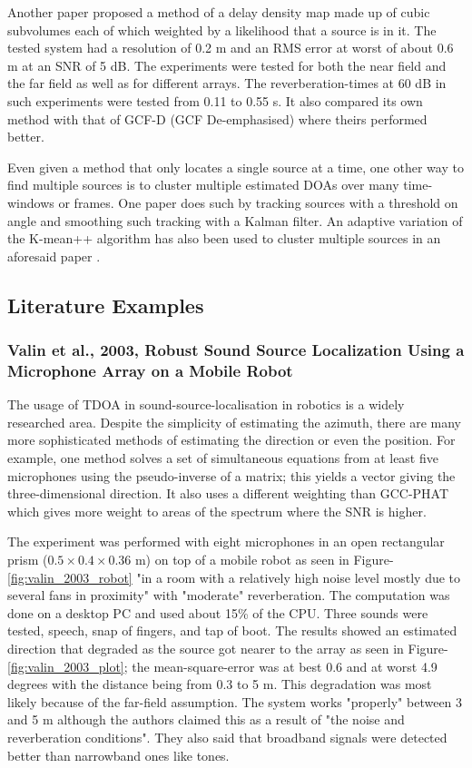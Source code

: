 \documentclass[notitlepage]{report}
\begin{document}
Another paper \cite{boora_tdoa-based_2020} proposed a method of a delay density map made up of cubic subvolumes each of which weighted by a likelihood that a source is in it. The tested system had a resolution of 0.2 \si{m} and an RMS error at worst of about 0.6 \si{m} at an SNR of 5 \si{dB}. The experiments were tested for both the near field and the far field as well as for different arrays. The reverberation-times at 60 \si{dB} in such experiments were tested from 0.11 to 0.55 \si{s}. It also compared its own method with that of GCF-D (GCF De-emphasised) where theirs performed better.

Even given a method that only locates a single source at a time, one other way to find multiple sources is to cluster multiple estimated DOAs over many time-windows or frames. One paper \cite{rascon_lightweight_2015} does such by tracking sources with a threshold on angle and smoothing such tracking with a Kalman filter. An adaptive variation of the K-mean++ algorithm has also been used to cluster multiple sources in an aforesaid paper \cite{hu_estimation_2009}.

\subsection{Literature Examples}

\subsubsection{Valin et al., 2003, Robust Sound Source Localization Using a Microphone Array on a Mobile Robot}

The usage of TDOA in sound-source-localisation in robotics is a widely researched area. Despite the simplicity of estimating the azimuth, there are many more sophisticated methods of estimating the direction or even the position. For example, one method \cite{valin_robust_2003} solves a set of simultaneous equations from at least five microphones using the pseudo-inverse of a matrix; this yields a vector giving the three-dimensional direction. It also uses a different weighting than GCC-PHAT which gives more weight to areas of the spectrum where the SNR is higher. 

The experiment was performed with eight microphones in an open rectangular prism ($0.5\times 0.4\times 0.36$ \si{m}) on top of a mobile robot as seen in Figure-\ref{fig:valin_2003_robot} "in a room with a relatively high noise level mostly due to several fans in proximity" with "moderate" reverberation. The computation was done on a desktop PC and used about 15\% of the CPU. Three sounds were tested, speech, snap of fingers, and tap of boot. The results showed an estimated direction that degraded as the source got nearer to the array as seen in Figure-\ref{fig:valin_2003_plot}; the mean-square-error was at best 0.6 and at worst 4.9 degrees with the distance being from 0.3 to 5 \si{m}. This degradation was most likely because of the far-field assumption. The system works "properly" between 3 and 5 \si{m} although the authors claimed this as a result of "the noise and reverberation conditions". They also said that broadband signals were detected better than narrowband ones like tones.
\end{document}
